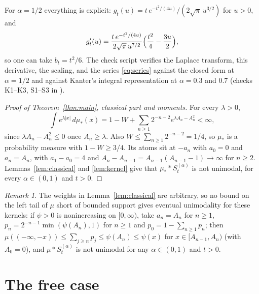 \documentclass[11pt]{amsart}
\theoremstyle{definition}
\theoremstyle{remark}
\newtheorem{remark}[theorem]{Remark}
\numberwithin{equation}{section}
\begin{document}
For $\alpha=1/2$ everything is explicit: $g_t(u)=t\,e^{-t^2/(4u)}/(2\sqrt\pi\,u^{3/2})$ for $u>0$, and
\[
g_t'(u)=\frac{t\,e^{-t^2/(4u)}}{2\sqrt\pi\,u^{7/2}}\Bigl(\frac{t^2}{4}-\frac{3u}{2}\Bigr),
\]
so one can take $b_t=t^2/6$. The check script verifies the Laplace transform, this derivative, the scaling, and the series \eqref{eq:series} against the closed form at $\alpha=1/2$ and against Kanter's integral representation \cite{Kanter} at $\alpha=0.3$ and $0.7$ (checks K1--K3, S1--S3 in \cite{code}).

\begin{proof}[Proof of Theorem~\ref{thm:main}, classical part and moments]
For every $\lambda>0$,
\[
\int e^{\lambda|x|}\,d\mu_\ast(x)=1-W+\sum_{n\ge1}2^{-n-2}e^{\lambda A_n-A_n^2}<\infty,
\]
since $\lambda A_n-A_n^2\le0$ once $A_n\ge\lambda$. Also $W\le\sum_{n\ge1}2^{-n-2}=1/4$, so $\mu_\ast$ is a probability measure with $1-W\ge3/4$. Its atoms sit at $-a_n$ with $a_0=0$ and $a_n=A_n$, with $a_1-a_0=4$ and $A_n-A_{n-1}=A_{n-1}(A_{n-1}-1)\to\infty$ for $n\ge2$. Lemmas~\ref{lem:classical} and \ref{lem:kernel} give that $\mu_\ast*S^{(\alpha)}_t$ is not unimodal, for every $\alpha\in(0,1)$ and $t>0$.
\end{proof}

\begin{remark}
The weights in Lemma~\ref{lem:classical} are arbitrary, so no bound on the left tail of $\mu$ short of bounded support gives eventual unimodality for these kernels: if $\psi>0$ is nonincreasing on $[0,\infty)$, take $a_n=A_n$ for $n\ge1$, $p_n=2^{-n-1}\min(\psi(A_n),1)$ for $n\ge1$ and $p_0=1-\sum_{n\ge1}p_n$; then $\mu((-\infty,-x))\le\sum_{j\ge n}p_j\le\psi(A_n)\le\psi(x)$ for $x\in[A_{n-1},A_n)$ (with $A_0=0$), and $\mu*S^{(\alpha)}_t$ is not unimodal for any $\alpha\in(0,1)$ and $t>0$.
\end{remark}

\section{The free case}\label{sec:free}
\end{document}
